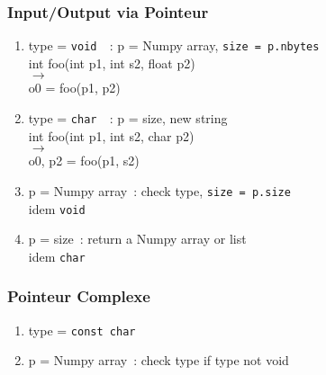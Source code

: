 \begin{frame}
  \frametitle{Input/Output via Pointeur}
  \begin{enumerate}
  \item type = \texttt{void \ptr}~: p = Numpy array, \texttt{size = p.nbytes} \\
    int foo(int p1, int \ptr s2, float \ptr p2) \\
    $\longrightarrow$ \\
    o0 = foo(p1, p2)
  \item type = \texttt{char \ptr}~: p = size, new string \\
    int foo(int p1, int \ptr s2, char \ptr p2) \\
    $\longrightarrow$ \\
    o0, p2 = foo(p1, s2)
  \item p = Numpy array~: check type, \texttt{size = p.size} \\
    idem \texttt{void \ptr}
  \item p = size~: return a Numpy array or list \\
    idem \texttt{char \ptr}
  \end{enumerate}
\end{frame}

\begin{frame}
  \frametitle{Pointeur Complexe}
  \begin{enumerate}
  [circle]
  \item type = \texttt{const char \ptr}
  \item p = Numpy array~: check type if type not void
  \end{enumerate}
\end{frame}

